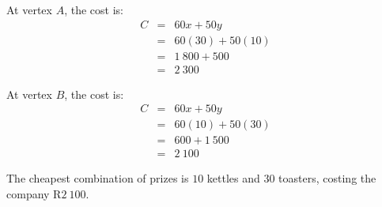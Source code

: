 \begin{wex}
{
At vertex $A$, the cost is:
\begin{eqnarray*}
C&=&60x+50y\\
&=&60(30)+50(10)\\
&=&1~800+500\\
&=&2~300
\end{eqnarray*}

At vertex $B$, the cost is:
\begin{eqnarray*}
C&=&60x+50y\\
&=&60(10)+50(30)\\
&=&600+1~500\\
&=&2~100
\end{eqnarray*}

The cheapest combination of prizes is $10$ kettles and $30$ toasters, costing the company R$2~100$.
}
\end{wex}

